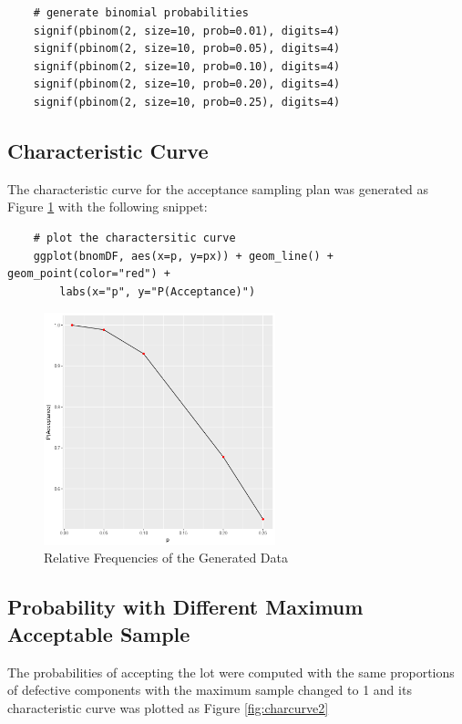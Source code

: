 \documentclass{article}
\begin{document}
\begin{lstlisting}
    # generate binomial probabilities
    signif(pbinom(2, size=10, prob=0.01), digits=4)
    signif(pbinom(2, size=10, prob=0.05), digits=4)
    signif(pbinom(2, size=10, prob=0.10), digits=4)
    signif(pbinom(2, size=10, prob=0.20), digits=4)
    signif(pbinom(2, size=10, prob=0.25), digits=4)
\end{lstlisting}


        \subsection{Characteristic Curve}
            The characteristic curve for the acceptance sampling plan was generated as Figure \ref{fig:charcurve1} with the following snippet:

\begin{lstlisting}
    # plot the charactersitic curve
    ggplot(bnomDF, aes(x=p, y=px)) + geom_line() + geom_point(color="red") +
        labs(x="p", y="P(Acceptance)")
\end{lstlisting}

            \begin{figure}[h]
                \begin{center}
                    \includegraphics[width=0.6\textwidth]{figures/charcurve1.png}
                    \caption{Relative Frequencies of the Generated Data} \label{fig:charcurve1}
                \end{center}
            \end{figure}


        \subsection{Probability with Different Maximum Acceptable Sample}
            The probabilities of accepting the lot were computed with the same proportions of defective components with the maximum sample changed to 1 and its characteristic curve was plotted as Figure \ref{fig:charcurve2}
\end{document}

